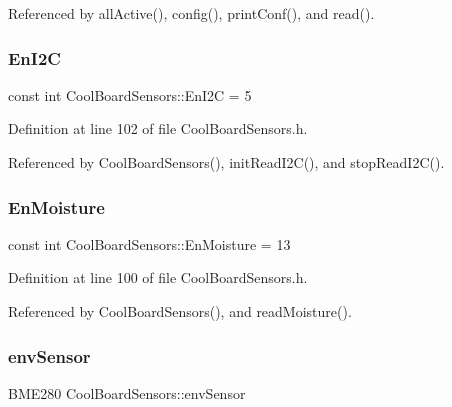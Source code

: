 Referenced by all\+Active(), config(), print\+Conf(), and read().

\mbox{\label{classCoolBoardSensors_aaa6b5dbf3a6633bffd9d204d961096dc}} 
\subsubsection{\texorpdfstring{En\+I2C}{EnI2C}}
{\footnotesize\ttfamily const int Cool\+Board\+Sensors\+::\+En\+I2C = 5\hspace{0.3cm}{\ttfamily [private]}}



Definition at line 102 of file Cool\+Board\+Sensors.\+h.



Referenced by Cool\+Board\+Sensors(), init\+Read\+I2\+C(), and stop\+Read\+I2\+C().

\mbox{\label{classCoolBoardSensors_a6177d02e14a057a2f171a2e930b5038d}} 
\subsubsection{\texorpdfstring{En\+Moisture}{EnMoisture}}
{\footnotesize\ttfamily const int Cool\+Board\+Sensors\+::\+En\+Moisture = 13\hspace{0.3cm}{\ttfamily [private]}}



Definition at line 100 of file Cool\+Board\+Sensors.\+h.



Referenced by Cool\+Board\+Sensors(), and read\+Moisture().

\mbox{\label{classCoolBoardSensors_a868e38985e9a2412829fa2790ca13e2e}} 
\subsubsection{\texorpdfstring{env\+Sensor}{envSensor}}
{\footnotesize\ttfamily B\+M\+E280 Cool\+Board\+Sensors\+::env\+Sensor}




